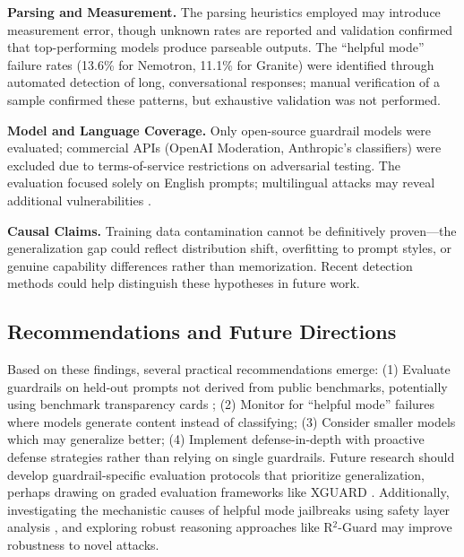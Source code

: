\documentclass{article}
\begin{document}
\textbf{Parsing and Measurement.} The parsing heuristics employed may introduce measurement error, though unknown rates are reported and validation confirmed that top-performing models produce parseable outputs. The ``helpful mode'' failure rates (13.6\% for Nemotron, 11.1\% for Granite) were identified through automated detection of long, conversational responses; manual verification of a sample confirmed these patterns, but exhaustive validation was not performed.

\textbf{Model and Language Coverage.} Only open-source guardrail models were evaluated; commercial APIs (OpenAI Moderation, Anthropic's classifiers) were excluded due to terms-of-service restrictions on adversarial testing. The evaluation focused solely on English prompts; multilingual attacks may reveal additional vulnerabilities \cite{kumar2024multilingual_toxicity, deng2024multilingual}.

\textbf{Causal Claims.} Training data contamination cannot be definitively proven---the generalization gap could reflect distribution shift, overfitting to prompt styles, or genuine capability differences rather than memorization. Recent detection methods \cite{li2024kds} could help distinguish these hypotheses in future work.

\subsection{Recommendations and Future Directions}
Based on these findings, several practical recommendations emerge: (1) Evaluate guardrails on held-out prompts not derived from public benchmarks, potentially using benchmark transparency cards \cite{yang2024leakage}; (2) Monitor for ``helpful mode'' failures where models generate content instead of classifying; (3) Consider smaller models which may generalize better; (4) Implement defense-in-depth with proactive defense strategies \cite{zhou2024proactive} rather than relying on single guardrails. Future research should develop guardrail-specific evaluation protocols that prioritize generalization, perhaps drawing on graded evaluation frameworks like XGUARD \cite{wang2024xguard}. Additionally, investigating the mechanistic causes of helpful mode jailbreaks using safety layer analysis \cite{wei2024safety_layers}, and exploring robust reasoning approaches like R$^2$-Guard \cite{yuan2024rguard} may improve robustness to novel attacks.

\end{document}
